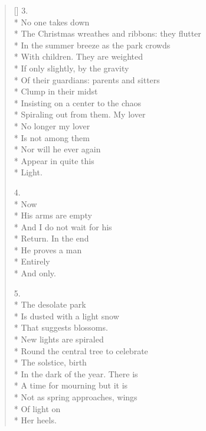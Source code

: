 \begin{verse}[\versewidth]
3.\\*
No one takes down \\*
The Christmas wreathes and ribbons: they flutter\\*
In the summer breeze as the park crowds \\*
With children.   They are weighted\\*
If only slightly, by the gravity\\*
Of their guardians: parents and sitters\\*
Clump in their midst\\*
Insisting on a center to the chaos\\*
Spiraling out from them. My lover\\*
No longer my lover\\*
Is not among them\\*
Nor will he ever again\\*
Appear in quite this \\*
Light.

4.\\*
Now\\*
His arms are empty\\*
And I do not wait for his\\*
Return.  In the end\\*
He proves a man\\*
Entirely\\*
And only.

5.\\*
The desolate park\\*
Is dusted with a light snow\\*
That suggests blossoms.\\*
New lights are spiraled\\*
Round the central tree to celebrate\\*
The solstice, birth\\*
In the dark of the year.  There is\\*
A time for mourning but it is\\*
Not as spring approaches, wings\\*
Of light on\\*
Her heels.
\end{verse}
